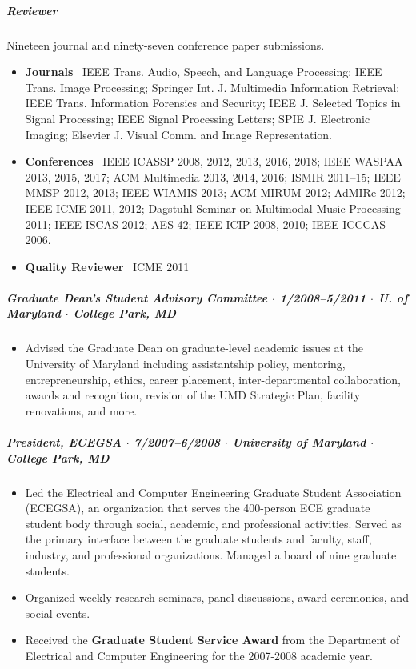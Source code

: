 \documentclass[10pt,letterpaper]{article}
\begin{document}
\subparagraph{Reviewer} Nineteen journal and ninety-seven conference paper submissions. 
\begin{itemize}
    \item \textbf{Journals} \ 
        IEEE Trans. Audio, Speech, and Language Processing;
        IEEE Trans. Image Processing; %
        Springer Int. J. Multimedia Information Retrieval; %
        IEEE Trans. Information Forensics and Security; %
        IEEE J. Selected Topics in Signal Processing; %
        IEEE Signal Processing Letters; %
        SPIE J. Electronic Imaging; %
        Elsevier J. Visual Comm. and Image Representation. %
    \item \textbf{Conferences} \ 
        IEEE ICASSP 2008, 2012, 2013, 2016, 2018; %
        IEEE WASPAA 2013, 2015, 2017; %
        ACM Multimedia 2013, 2014, 2016; %
        ISMIR 2011--15; %
        IEEE MMSP 2012, 2013; %
        IEEE WIAMIS 2013; %
        ACM MIRUM 2012; %
        AdMIRe 2012; %
        IEEE ICME 2011, 2012; %
        Dagstuhl Seminar on Multimodal Music Processing 2011; %
        IEEE ISCAS 2012; %
        AES 42; %
        IEEE ICIP 2008, 2010; %
        IEEE ICCCAS 2006. %
    \item \textbf{Quality Reviewer} \ ICME 2011
\end{itemize}

\subparagraph{Graduate Dean's Student Advisory Committee $\cdot$ \textnormal{1/2008--5/2011} $\cdot$ U. of Maryland $\cdot$ \textnormal{College Park, MD}}
\begin{itemize}
    \item Advised the Graduate Dean on graduate-level academic issues at the University of Maryland including assistantship policy, mentoring, entrepreneurship, ethics, career placement, inter-departmental collaboration, awards and recognition, revision of the UMD Strategic Plan, facility renovations, and more.
\end{itemize}

\subparagraph{President, ECEGSA $\cdot$ \textnormal{7/2007--6/2008} $\cdot$ University of Maryland $\cdot$ \textnormal{College Park, MD}}
\begin{itemize}
    \item Led the Electrical and Computer Engineering Graduate Student Association (ECEGSA), an organization that serves the 400-person ECE graduate student body through social, academic, and professional activities.  Served as the primary interface between the graduate students and faculty, staff, industry, and professional organizations.  Managed a board of nine graduate students. 
    \item Organized weekly research seminars, panel discussions, award ceremonies,  and social events.
    \item Received the \textbf{Graduate Student Service Award} from the Department of Electrical and Computer Engineering for the 2007-2008 academic year.
\end{itemize}
\end{document}
